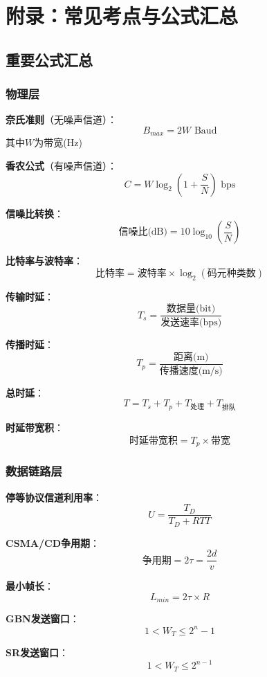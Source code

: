 \chapter{附录：常见考点与公式汇总}

\section{重要公式汇总}

\subsection{物理层}

\begin{formulabox}
\textbf{奈氏准则}（无噪声信道）：
$$B_{max} = 2W \text{ Baud}$$
其中$W$为带宽(Hz)

\textbf{香农公式}（有噪声信道）：
$$C = W \log_2\left(1 + \frac{S}{N}\right) \text{ bps}$$

\textbf{信噪比转换}：
$$\text{信噪比(dB)} = 10\log_{10}\left(\frac{S}{N}\right)$$

\textbf{比特率与波特率}：
$$\text{比特率} = \text{波特率} \times \log_2(\text{码元种类数})$$

\textbf{传输时延}：
$$T_s = \frac{\text{数据量(bit)}}{\text{发送速率(bps)}}$$

\textbf{传播时延}：
$$T_p = \frac{\text{距离(m)}}{\text{传播速度(m/s)}}$$

\textbf{总时延}：
$$T = T_s + T_p + T_{处理} + T_{排队}$$

\textbf{时延带宽积}：
$$\text{时延带宽积} = T_p \times \text{带宽}$$
\end{formulabox}

\subsection{数据链路层}

\begin{formulabox}
\textbf{停等协议信道利用率}：
$$U = \frac{T_D}{T_D + RTT}$$

\textbf{CSMA/CD争用期}：
$$\text{争用期} = 2\tau = \frac{2d}{v}$$

\textbf{最小帧长}：
$$L_{min} = 2\tau \times R$$

\textbf{GBN发送窗口}：
$$1 < W_T \leq 2^n - 1$$

\textbf{SR发送窗口}：
$$1 < W_T \leq 2^{n-1}$$
\end{formulabox}

